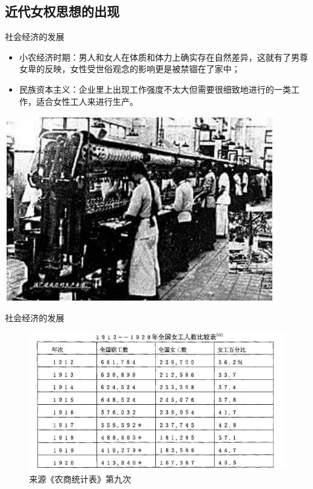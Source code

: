 \subsection{近代女权思想的出现}
\begin{frame}{社会经济的发展}
    \begin{block}{}
        \begin{itemize}
            \item 小农经济时期：男人和女人在体质和体力上确实存在自然差异，这就有了男尊女卑的反映，女性受世俗观念的影响更是被禁锢在了家中；
            \item 民族资本主义：企业里上出现工作强度不太大但需要很细致地进行的一类工作，适合女性工人来进行生产。
        \end{itemize}
    \end{block}
    \begin{center}
        \includegraphics[width=.45\textwidth]{../docs/img/1-2.jpg}
    \end{center}
\end{frame}

\begin{frame}{社会经济的发展}
    \begin{figure}
        \centering
        \includegraphics[width=.8\textwidth]{../docs/img/1-1.jpg}
        \caption{来源《农商统计表》第九次}
    \end{figure}
\end{frame}

